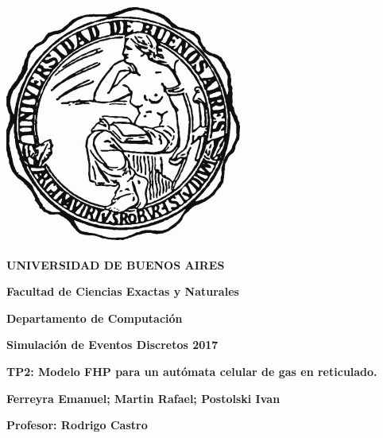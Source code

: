 






%
\thispagestyle{empty}

\begin {center}

\includegraphics[scale=.3]{uba2.jpg}

\medskip
\textbf{UNIVERSIDAD DE BUENOS AIRES}

\smallskip

\textbf{Facultad de Ciencias Exactas y Naturales}

\smallskip

\textbf{Departamento de Computaci\'on}

\vspace{3.5cm}

\textbf{\large Simulaci\'on de Eventos Discretos 2017}


\vspace{3cm}

\vspace{1.5cm}

\textbf{\large TP2: Modelo FHP para un aut\'omata celular de gas en reticulado.}

\vspace{1.5cm}


\textbf{Ferreyra Emanuel; Martin Rafael; Postolski Ivan}

\end {center}


\vspace{1.5cm}

\noindent \textbf{Profesor: Rodrigo Castro} \




%
